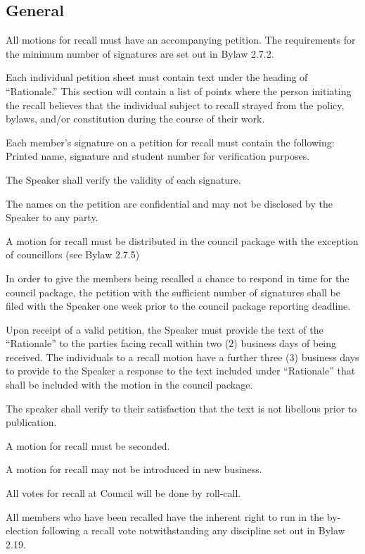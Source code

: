 \subsection{General}
\begin{longenum}[ label*=\thesubsection.\arabic*., align=left]
	\item  All motions for recall must have an accompanying petition. The requirements for the minimum number of signatures are set out in Bylaw 2.7.2.
	\begin{longenum}[ label*=\arabic*., align=left]
		\item Each individual petition sheet must contain text under the heading of ``Rationale.''  This section will contain a list of points where the person initiating the recall believes that the individual subject to recall strayed from the policy, bylaws, and/or constitution during the course of their work.
        \item Each member's signature on a petition for recall must contain the following: Printed name, signature and student number for verification purposes.
        \item The Speaker shall verify the validity of each signature.
        \item The names on the petition are confidential and may not be disclosed by the Speaker to any party.
    \end{longenum}
    \item A motion for recall must be distributed in the council package with the exception of councillors (see Bylaw 2.7.5)
    \item In order to give the members being recalled a chance to respond in time for the council package, the petition with the sufficient number of signatures shall be filed with the Speaker one week prior to the council package reporting deadline.
    \item Upon receipt of a valid petition, the Speaker must provide the text of the ``Rationale'' to the parties facing recall within two (2) business days of being received. The individuals to a recall motion have a further three (3) business days to provide to the Speaker a response to the text included under ``Rationale'' that shall be included with the motion in the council package.
    \item The speaker shall verify to their satisfaction that the text is not libellous prior to publication.
    \item A motion for recall must be seconded.
    \item A motion for recall may not be introduced in new business.
    \item All votes for recall at Council will be done by roll-call.
    \item All members who have been recalled have the inherent right to run in the by-election following a recall vote notwithstanding any discipline set out in Bylaw 2.19.
\end{longenum}


